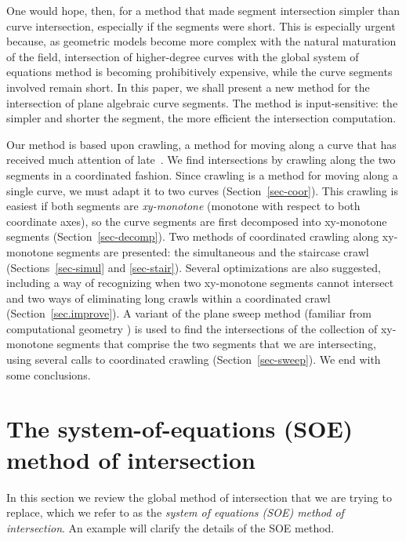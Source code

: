 One would hope, then, for a method that made segment intersection simpler than curve 
intersection, especially if the segments were short.
This is especially urgent because, as geometric models become more complex with 
the natural maturation of the field, intersection of higher-degree curves 
with the global system of equations method is becoming prohibitively expensive, 
while the curve segments involved remain short.
In this paper, we shall present a new method for the intersection of plane
algebraic curve segments.
The method is input-sensitive: the simpler and shorter the segment, 
the more efficient the intersection computation.

Our method is based upon crawling, a method for moving along a curve that has 
received much attention of late~\cite{bhh,dtw,h,hl,or,Tim77}.
We find intersections by crawling along the two segments in a coordinated fashion.
Since crawling is a method for moving along a single curve, we must adapt it to two curves
(Section~\ref{sec-coor}).
This crawling is easiest if both segments are {\em xy-monotone} (monotone with 
respect to both coordinate axes), so the curve segments are first decomposed into 
xy-monotone segments (Section~\ref{sec-decomp}).
Two methods of coordinated crawling along xy-monotone segments are presented: 
the simultaneous and the staircase crawl (Sections~\ref{sec-simul} and \ref{sec-stair}).
Several optimizations are also suggested,
including a way of recognizing when two xy-monotone segments cannot intersect 
and two ways of eliminating long crawls within a coordinated crawl (Section~\ref{sec.improve}).
A variant of the plane sweep method (familiar from computational geometry 
\cite{BeO79,E87,PS85}) is used to find
the intersections of the collection of xy-monotone segments that comprise the two segments
that we are intersecting, using several calls to coordinated crawling (Section~\ref{sec-sweep}).
We end with some conclusions.

\section{The system-of-equations (SOE) method of intersection}
\label{sec-soe}

In this section we review the global method of intersection that we are trying to replace, 
which we refer to as the {\em system of equations (SOE) method of intersection}.
An example will clarify the details of the SOE method.

